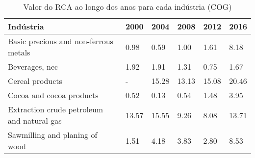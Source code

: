 \begin{table}
\centering
\caption{Valor do RCA ao longo dos anos para cada indústria (COG)}
\label{tab:ex3-tempo-COG}
\begin{tabular}{p{6cm}p{1.5cm}p{1.5cm}p{1.5cm}p{1.5cm}p{1.5cm}}
\toprule
                                 Indústria &  2000 &  2004 &  2008 &  2012 &  2016 \\
\midrule
     Basic precious and non-ferrous metals &  0.98 &  0.59 &  1.00 &  1.61 &  8.18 \\
                            Beverages, nec &  1.92 &  1.91 &  1.31 &  0.75 &  1.67 \\
                           Cereal products &     - & 15.28 & 13.13 & 15.08 & 20.46 \\
                  Cocoa and cocoa products &  0.52 &  0.13 &  0.54 &  1.48 &  3.95 \\
Extraction crude petroleum and natural gas & 13.57 & 15.55 &  9.26 &  8.08 & 13.71 \\
            Sawmilling and planing of wood &  1.51 &  4.18 &  3.83 &  2.80 &  8.53 \\
\bottomrule
\end{tabular}
\end{table}
